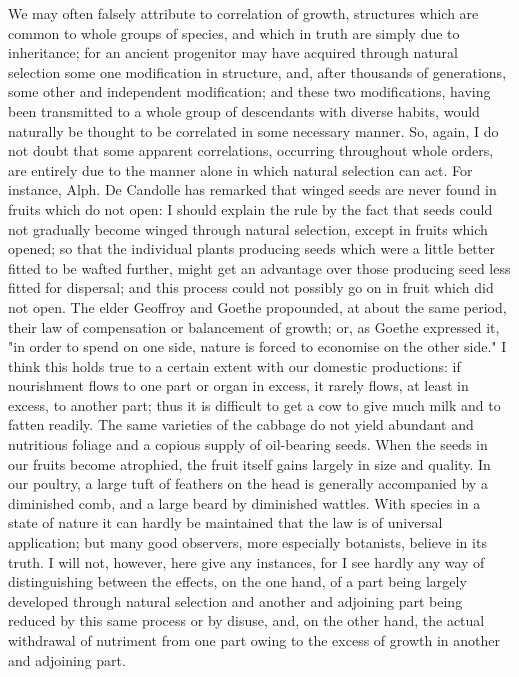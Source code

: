 We may often falsely attribute to correlation of growth, structures which are common to whole groups of species, and which in truth are simply due to inheritance; for an ancient progenitor may have acquired through natural selection some one modification in structure, and, after thousands of generations, some other and independent modification; and these two modifications, having been transmitted to a whole group of descendants with diverse habits, would naturally be thought to be correlated in some necessary manner. So, again, I do not doubt that some apparent correlations, occurring throughout whole orders, are entirely due to the manner alone in which natural selection can act. For instance, Alph. De Candolle has remarked that winged seeds are never found in fruits which do not open: I should explain the rule by the fact that seeds could not gradually become winged through natural selection, except in fruits which opened; so that the individual plants producing seeds which were a little better fitted to be wafted further, might get an advantage over those producing seed less fitted for dispersal; and this process could not possibly go on in fruit which did not open.
The elder Geoffroy and Goethe propounded, at about the same period, their law of compensation or balancement of growth; or, as Goethe expressed it, "in order to spend on one side, nature is forced to economise on the other side." I think this holds true to a certain extent with our domestic productions: if nourishment flows to one part or organ in excess, it rarely flows, at least in excess, to another part; thus it is difficult to get a cow to give much milk and to fatten readily. The same varieties of the cabbage do not yield abundant and nutritious foliage and a copious supply of oil-bearing seeds. When the seeds in our fruits become atrophied, the fruit itself gains largely in size and quality. In our poultry, a large tuft of feathers on the head is generally accompanied by a diminished comb, and a large beard by diminished wattles. With species in a state of nature it can hardly be maintained that the law is of universal application; but many good observers, more especially botanists, believe in its truth. I will not, however, here give any instances, for I see hardly any way of distinguishing between the effects, on the one hand, of a part being largely developed through natural selection and another and adjoining part being reduced by this same process or by disuse, and, on the other hand, the actual withdrawal of nutriment from one part owing to the excess of growth in another and adjoining part.
